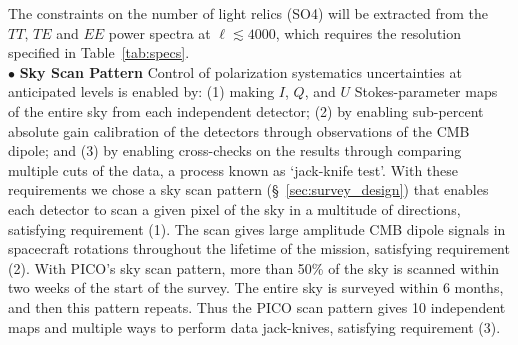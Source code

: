 \documentclass[PICOAPC.tex]{subfiles}
\begin{document}
The constraints on the number of light relics (SO4) will be extracted from the $TT,\,TE$ and $EE$ power spectra at $\ell \lesssim 4000$, which requires the resolution specified in Table~\ref{tab:specs}. \\
%
$\bullet$ {\bf Sky Scan Pattern} \hspace{0.1in} 
Control of polarization systematics uncertainties at anticipated levels is enabled by: (1) making $I$, $Q$, and $U$ Stokes-parameter maps of the entire sky from each independent detector; (2) by enabling sub-percent absolute gain calibration of the detectors through observations of the CMB dipole; and (3) by enabling cross-checks on the results through comparing multiple cuts of the data, a process known as `jack-knife test'.   With these requirements we chose a sky scan pattern (\S~\ref{sec:survey_design}) that enables each detector to scan a given pixel of the sky in a multitude of directions, satisfying requirement (1). The scan gives large amplitude CMB dipole signals in spacecraft rotations throughout the lifetime of the mission, satisfying requirement (2). With PICO's sky scan pattern, more than 50\% of the sky is  scanned within two weeks of the start of the survey. The entire sky is surveyed within 6 months, and then this pattern repeats. Thus the PICO scan pattern gives 10 independent maps and multiple ways to perform data jack-knives, satisfying requirement (3).   

 
\end{document}
